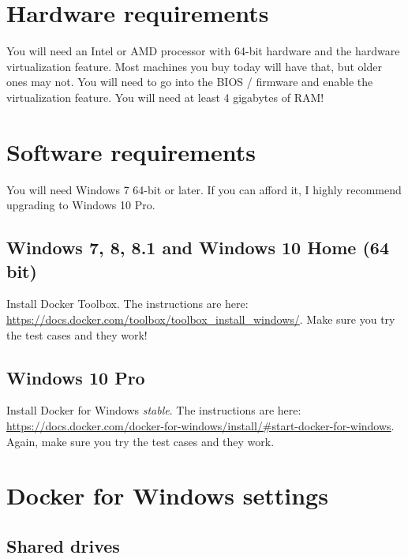 \documentclass[]{book}
\theoremstyle{definition}
\theoremstyle{definition}
\theoremstyle{definition}
\theoremstyle{remark}
\begin{document}
\hypertarget{hardware-requirements}{%
\section{Hardware requirements}\label{hardware-requirements}}

You will need an Intel or AMD processor with 64-bit hardware and the
hardware virtualization feature. Most machines you buy today will have
that, but older ones may not. You will need to go into the BIOS /
firmware and enable the virtualization feature. You will need at least 4
gigabytes of RAM!

\hypertarget{software-requirements}{%
\section{Software requirements}\label{software-requirements}}

You will need Windows 7 64-bit or later. If you can afford it, I highly
recommend upgrading to Windows 10 Pro.

\hypertarget{windows-7-8-8.1-and-windows-10-home-64-bit}{%
\subsection{Windows 7, 8, 8.1 and Windows 10 Home (64
bit)}\label{windows-7-8-8.1-and-windows-10-home-64-bit}}

Install Docker Toolbox. The instructions are here:
\url{https://docs.docker.com/toolbox/toolbox_install_windows/}. Make
sure you try the test cases and they work!

\hypertarget{windows-10-pro}{%
\subsection{Windows 10 Pro}\label{windows-10-pro}}

Install Docker for Windows \emph{stable}. The instructions are here:
\url{https://docs.docker.com/docker-for-windows/install/\#start-docker-for-windows}.
Again, make sure you try the test cases and they work.

\hypertarget{docker-for-windows-settings}{%
\section{Docker for Windows
settings}\label{docker-for-windows-settings}}

\hypertarget{shared-drives}{%
\subsection{Shared drives}\label{shared-drives}}
\end{document}
